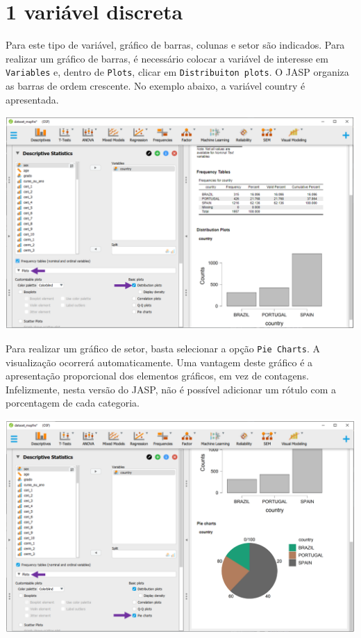 \documentclass[
]{book}
\begin{document}
\hypertarget{variuxe1vel-discreta-1}{%
\section{1 variável discreta}\label{variuxe1vel-discreta-1}}

Para este tipo de variável, gráfico de barras, colunas e setor são indicados. Para realizar um gráfico de barras, é necessário colocar a variável de interesse em \texttt{Variables} e, dentro de \texttt{Plots}, clicar em \texttt{Distribuiton\ plots}. O JASP organiza as barras de ordem crescente. No exemplo abaixo, a variável country é apresentada.

\includegraphics{./img/cap_desc_jasp_grafico_barras.png}

Para realizar um gráfico de setor, basta selecionar a opção \texttt{Pie\ Charts}. A visualização ocorrerá automaticamente. Uma vantagem deste gráfico é a apresentação proporcional dos elementos gráficos, em vez de contagens. Infelizmente, nesta versão do JASP, não é possível adicionar um rótulo com a porcentagem de cada categoria.

\includegraphics{./img/cap_desc_jasp_grafico_setor.png}
\end{document}

